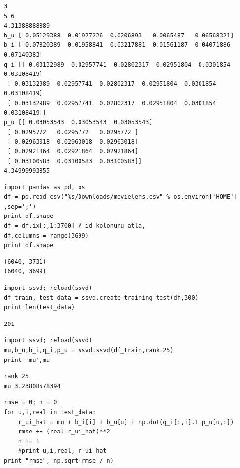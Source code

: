 \documentclass[12pt,fleqn]{article}\usepackage{../common}
\begin{document}
\begin{verbatim}
3
5 6
4.31388888889
b_u [ 0.05129388  0.01927226  0.0206893   0.0065487   0.06568321]
b_i [ 0.07820389  0.01958841 -0.03217881  0.01561187  0.04071886  0.07140383]
q_i [[ 0.03132989  0.02957741  0.02802317  0.02951804  0.0301854   0.03108419]
 [ 0.03132989  0.02957741  0.02802317  0.02951804  0.0301854   0.03108419]
 [ 0.03132989  0.02957741  0.02802317  0.02951804  0.0301854   0.03108419]]
p_u [[ 0.03053543  0.03053543  0.03053543]
 [ 0.0295772   0.0295772   0.0295772 ]
 [ 0.02963018  0.02963018  0.02963018]
 [ 0.02921864  0.02921864  0.02921864]
 [ 0.03100583  0.03100583  0.03100583]]
4.34999993855
\end{verbatim}


\begin{verbatim}
import pandas as pd, os
df = pd.read_csv("%s/Downloads/movielens.csv" % os.environ['HOME'] ,sep=';')
print df.shape
df = df.ix[:,1:3700] # id kolonunu atla,
df.columns = range(3699)
print df.shape
\end{verbatim}

\begin{verbatim}
(6040, 3731)
(6040, 3699)
\end{verbatim}

\begin{verbatim}
import ssvd; reload(ssvd)
df_train, test_data = ssvd.create_training_test(df,300)
print len(test_data)
\end{verbatim}

\begin{verbatim}
201
\end{verbatim}


\begin{verbatim}
import ssvd; reload(ssvd)
mu,b_u,b_i,q_i,p_u = ssvd.ssvd(df_train,rank=25)
print 'mu',mu
\end{verbatim}

\begin{verbatim}
rank 25
mu 3.23808578394
\end{verbatim}


\begin{verbatim}
rmse = 0; n = 0
for u,i,real in test_data:
    r_ui_hat = mu + b_i[i] + b_u[u] + np.dot(q_i[:,i].T,p_u[u,:])
    rmse += (real-r_ui_hat)**2
    n += 1
    #print u,i,real, r_ui_hat
print "rmse", np.sqrt(rmse / n)
\end{verbatim}
\end{document}
